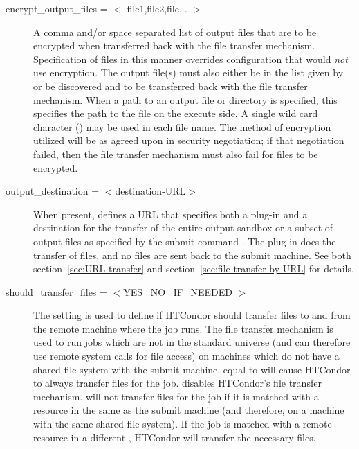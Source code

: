 \begin{description}

\label{man-condor-submit-encrypt-output-files}
\item[encrypt\_output\_files = $<$ file1,file2,file... $>$] 
A comma and/or space separated list of output files that are to be
encrypted when transferred back with the file transfer mechanism.
Specification of files in this manner overrides configuration that would
\emph{not} use encryption.
The output file(s) must also either be in the list given by
 or be discovered and to be transferred
back with the file transfer mechanism.
When a path to an output file or directory is specified, 
this specifies the path to the file on the execute side.
A single wild card character (\Expr{*}) may be used in each file name.
The method of encryption utilized will be as agreed upon in security
negotiation; if that negotiation failed, then the file transfer
mechanism must also fail for files to be encrypted.


\label{man-condor-submit-output-destintation}
\item[output\_destination = $<$destination-URL$>$] 
When present, defines a URL that specifies both a plug-in and a
destination for the transfer of the entire output sandbox or
a subset of output files as specified by the submit command
.
The plug-in does the transfer of files, 
and no files are sent back to the submit machine.
See both section~\ref{sec:URL-transfer} and
section~\ref{sec:file-transfer-by-URL} for details. 


\label{man-condor-submit-should-transfer-files}
\item[should\_transfer\_files = $<$YES \Bar\ NO \Bar\ IF\_NEEDED $>$] 
The  setting is used to define if HTCondor
should transfer files to and from the remote machine where the job
runs.
The file transfer mechanism is used to run jobs which are not in the
standard universe (and can therefore use remote system calls for file
access) on machines which do not have a shared file system with the
submit machine.
 equal to  will cause HTCondor to
always transfer files for the job.
 disables HTCondor's file transfer mechanism.
 will not transfer files for the job if it is matched
with a resource in the same  as the submit
machine (and therefore, on a machine with the same shared file
system).
If the job is matched with a remote resource in a different 
, HTCondor will transfer the necessary files. 


\end{description}
